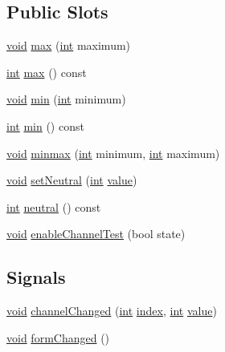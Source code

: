 \subsection*{Public Slots}
\begin{DoxyCompactItemize}
\item 
\hyperlink{group___u_a_v_objects_plugin_ga444cf2ff3f0ecbe028adce838d373f5c}{void} \hyperlink{group___config_plugin_gadeee570b83855701e61945279673cd59}{max} (\hyperlink{ioapi_8h_a787fa3cf048117ba7123753c1e74fcd6}{int} maximum)
\item 
\hyperlink{ioapi_8h_a787fa3cf048117ba7123753c1e74fcd6}{int} \hyperlink{group___config_plugin_gac5e9e5be40f804ee632232a3e980ee0d}{max} () const 
\item 
\hyperlink{group___u_a_v_objects_plugin_ga444cf2ff3f0ecbe028adce838d373f5c}{void} \hyperlink{group___config_plugin_gac5d132282f1a4c2233999a1041995124}{min} (\hyperlink{ioapi_8h_a787fa3cf048117ba7123753c1e74fcd6}{int} minimum)
\item 
\hyperlink{ioapi_8h_a787fa3cf048117ba7123753c1e74fcd6}{int} \hyperlink{group___config_plugin_ga2086e4a8bc1572b98114b0272313ed2a}{min} () const 
\item 
\hyperlink{group___u_a_v_objects_plugin_ga444cf2ff3f0ecbe028adce838d373f5c}{void} \hyperlink{group___config_plugin_gad231eb8bdcfa798ec5246049fdd07ae4}{minmax} (\hyperlink{ioapi_8h_a787fa3cf048117ba7123753c1e74fcd6}{int} minimum, \hyperlink{ioapi_8h_a787fa3cf048117ba7123753c1e74fcd6}{int} maximum)
\item 
\hyperlink{group___u_a_v_objects_plugin_ga444cf2ff3f0ecbe028adce838d373f5c}{void} \hyperlink{group___config_plugin_ga46c4da3a30cc25c1178b9f9a125c8660}{set\-Neutral} (\hyperlink{ioapi_8h_a787fa3cf048117ba7123753c1e74fcd6}{int} \hyperlink{glext_8h_aa0e2e9cea7f208d28acda0480144beb0}{value})
\item 
\hyperlink{ioapi_8h_a787fa3cf048117ba7123753c1e74fcd6}{int} \hyperlink{group___config_plugin_ga7ec2288bf27bf15dfb962c5e965d008e}{neutral} () const 
\item 
\hyperlink{group___u_a_v_objects_plugin_ga444cf2ff3f0ecbe028adce838d373f5c}{void} \hyperlink{group___config_plugin_ga306e95f301ee75290ea828d4c7e04a60}{enable\-Channel\-Test} (bool state)
\end{DoxyCompactItemize}
\subsection*{Signals}
\begin{DoxyCompactItemize}
\item 
\hyperlink{group___u_a_v_objects_plugin_ga444cf2ff3f0ecbe028adce838d373f5c}{void} \hyperlink{group___config_plugin_gabf138ec695ffe189e33d200b031e2687}{channel\-Changed} (\hyperlink{ioapi_8h_a787fa3cf048117ba7123753c1e74fcd6}{int} \hyperlink{glext_8h_ab47dd9958bcadea08866b42bf358e95e}{index}, \hyperlink{ioapi_8h_a787fa3cf048117ba7123753c1e74fcd6}{int} \hyperlink{glext_8h_aa0e2e9cea7f208d28acda0480144beb0}{value})
\item 
\hyperlink{group___u_a_v_objects_plugin_ga444cf2ff3f0ecbe028adce838d373f5c}{void} \hyperlink{group___config_plugin_gaa777808eac827fbf95642188024fc667}{form\-Changed} ()
\end{DoxyCompactItemize}
